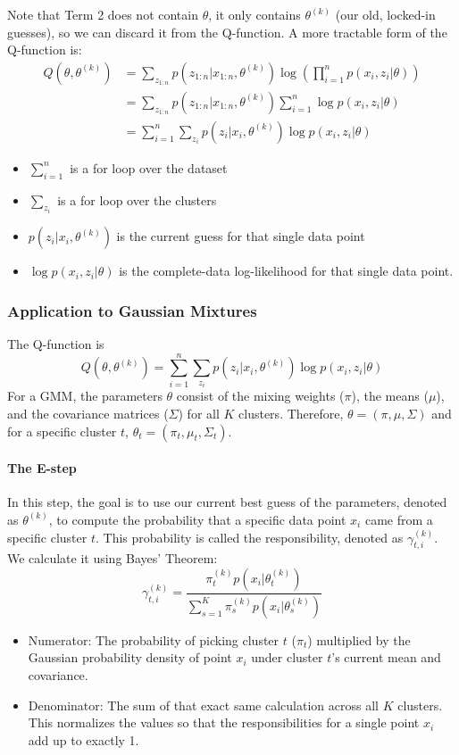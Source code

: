 \documentclass[../Probability.tex]{subfiles}
\begin{document}
\smallskip
\noindent Note that Term 2 does not contain $\theta$, it only contains $\theta^{(k)}$ (our old, locked-in guesses), so we can discard it from the Q-function.\newline
A more tractable form of the Q-function is:
\begin{align*}
    Q(\theta, \theta^{(k)}) &= \sum_{z_{1:n}} p(z_{1:n}|x_{1:n}, \theta^{(k)}) \log \left( \prod_{i=1}^n p(x_i, z_i|\theta) \right) \\
    &= \sum_{z_{1:n}} p(z_{1:n}|x_{1:n}, \theta^{(k)}) \sum_{i=1}^n \log p(x_i, z_i|\theta) \\
    &= \sum_{i=1}^n \sum_{z_i} p(z_i|x_i, \theta^{(k)}) \log p(x_i, z_i|\theta)
\end{align*}
\begin{itemize}
    \item $\sum_{i=1}^n$ is a for loop over the dataset
    \item $\sum_{z_i}$ is a for loop over the clusters
    \item $p(z_i|x_i, \theta^{(k)})$ is the current guess for that single data point
    \item $\log p(x_i, z_i|\theta)$ is the complete-data log-likelihood for that single data point.
\end{itemize}

\subsubsection{Application to Gaussian Mixtures}
The Q-function is
$$Q(\theta,\theta^{(k)})=\sum_{i=1}^{n}\sum_{z_{i}}p(z_{i}|x_{i},\theta^{(k)})\log p(x_{i},z_{i}|\theta)$$
For a GMM, the parameters $\theta$ consist of the mixing weights ($\pi$), the means ($\mu$), and the covariance matrices ($\Sigma$) for all $K$ clusters. Therefore, $\theta = (\pi, \mu, \Sigma)$ and for a specific cluster $t$, $\theta_t = (\pi_t, \mu_t, \Sigma_t)$.
\paragraph{The E-step} In this step, the goal is to use our current best guess of the parameters, denoted as $\theta^{(k)}$, to compute the probability that a specific data point $x_i$ came from a specific cluster $t$.\newline
This probability is called the responsibility, denoted as $\gamma_{t,i}^{(k)}$. We calculate it using Bayes' Theorem:
$$\gamma_{t,i}^{(k)} = \frac{\pi_t^{(k)} p(x_i | \theta_t^{(k)})}{\sum_{s=1}^K \pi_s^{(k)} p(x_i | \theta_s^{(k)})}$$
\begin{itemize}
    \item Numerator: The probability of picking cluster $t$ ($\pi_t$) multiplied by the Gaussian probability density of point $x_i$ under cluster $t$'s current mean and covariance.
    \item Denominator: The sum of that exact same calculation across all $K$ clusters. This normalizes the values so that the responsibilities for a single point $x_i$ add up to exactly 1.
\end{itemize}
\end{document}
